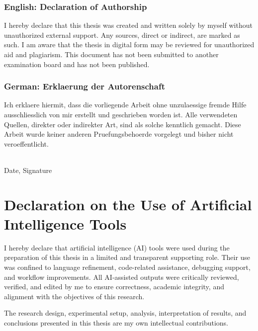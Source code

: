 \documentclass[a4paper,11pt,oneside,openany]{report}
\begin{document}
  \subsection*{English: Declaration of Authorship}

  I hereby declare that this thesis was created and written solely by myself
  without unauthorized external support. Any sources, direct or indirect, are
  marked as such. I am aware that the thesis in digital form may be reviewed
  for unauthorized aid and plagiarism. This document has not been submitted to
  another examination board and has not been published.

  \subsection*{German: Erklaerung der Autorenschaft}

  Ich erklaere hiermit, dass die vorliegende Arbeit ohne unzulaessige fremde
  Hilfe ausschliesslich von mir erstellt und geschrieben worden ist. Alle
  verwendeten Quellen, direkter oder indirekter Art, sind als solche kenntlich
  gemacht. Diese Arbeit wurde keiner anderen Pruefungsbehoerde vorgelegt und
  bisher nicht veroeffentlicht.

  \vspace{20mm}

  \dotfill\\
  Date, Signature

  \newpage

  \chapter*{Declaration on the Use of Artificial\\ Intelligence Tools}

  I hereby declare that artificial intelligence (AI) tools were used during the
  preparation of this thesis in a limited and transparent supporting role.
  Their use was confined to language refinement, code-related assistance,
  debugging support, and workflow improvements. All AI-assisted outputs were
  critically reviewed, verified, and edited by me to ensure correctness,
  academic integrity, and alignment with the objectives of this research.

  The research design, experimental setup, analysis, interpretation of results,
  and conclusions presented in this thesis are my own intellectual
  contributions.
\end{document}
